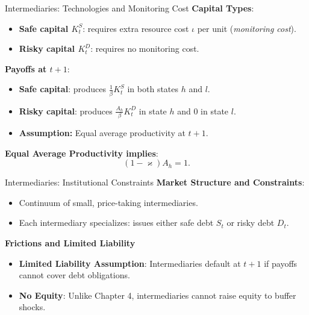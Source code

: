 \documentclass[11pt,aspectratio=169]{beamer}
\begin{document}
\begin{frame}{Intermediaries: Technologies and Monitoring Cost}
\small
\textbf{Capital Types}:
\begin{itemize}
  \item \textbf{Safe capital $K_t^S$}: requires extra resource cost $\iota$ per unit (\textit{monitoring cost}).
  \item \textbf{Risky capital $K_t^D$}: requires no monitoring cost.
\end{itemize}

\vspace{0.2cm}
\textbf{Payoffs at $t+1$}:
\begin{itemize}
  \item \textbf{Safe capital}: produces $\frac{1}{\beta}K_t^S$ in both states $h$ and $l$.
  \item \textbf{Risky capital}: produces $\frac{A_h}{\beta}K_t^D$ in state $h$ and $0$ in state $l$.
  \item \textbf{Assumption:} Equal average productivity at $t+1$.
\end{itemize}

\vspace{0.2cm}
\textbf{Equal Average Productivity implies}:
\[
(1-\varkappa)A_h=1.
\]

\end{frame}

\begin{frame}{Intermediaries: Institutional Constraints}
\small
\textbf{Market Structure and Constraints}:
\begin{itemize}
  \item Continuum of small, price-taking intermediaries.
  \item Each intermediary specializes: issues either safe debt $S_t$ or risky debt $D_t$.
\end{itemize}

\vspace{0.4cm}
\textbf{Frictions and Limited Liability}
\begin{itemize}
    \item \textbf{Limited Liability Assumption}: Intermediaries default at $t+1$ if payoffs cannot cover debt obligations.
    \item \textbf{No Equity}: Unlike Chapter 4, intermediaries cannot raise equity to buffer shocks.
\end{itemize}
\end{frame}
\end{document}
